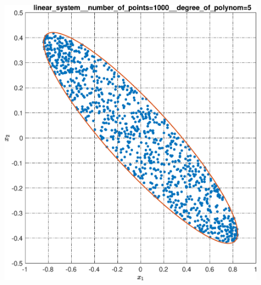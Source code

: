 \documentclass[../main.tex]{subfiles}
\begin{document}
  \begin{figure}[ht!] 
  	\hspace{-2.5ex}
  	\begin{minipage}[b]{.49\linewidth} 
  		\small
  		\centering 
  		\includegraphics[width=\linewidth]{images/linear_system__number_of_points=1000__degree_of_polynom=5.eps}
  	\end{minipage}
  	\hfill
  	\begin{minipage}[b]{.49\linewidth} 
  		\small
  		\centering

\end{minipage}
\end{figure}
\end{document}
